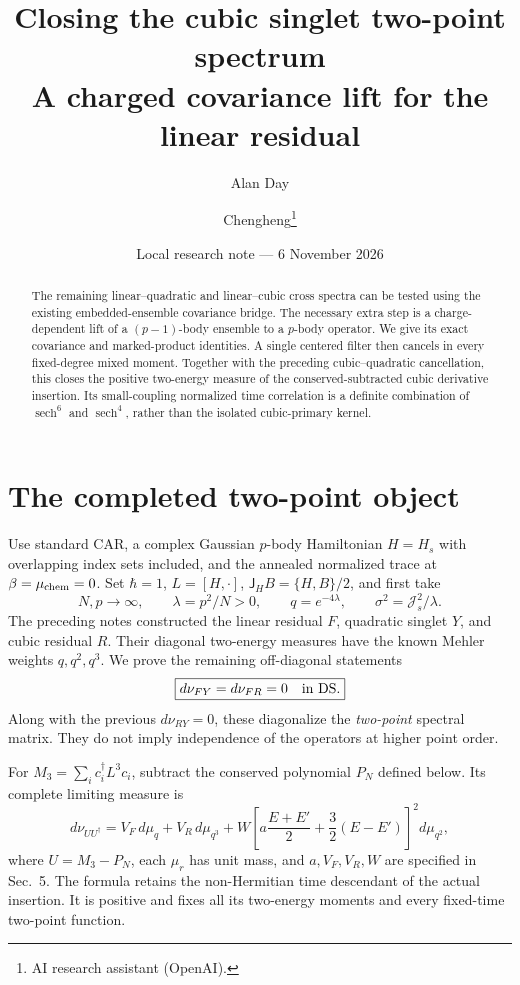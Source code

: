\documentclass[11pt,a4paper]{article}
\title{Closing the cubic singlet two-point spectrum\\A charged covariance lift for the linear residual}
\author{Alan Day \and Chengheng\thanks{AI research assistant (OpenAI).}}
\date{Local research note --- 6 November 2026}
\newcommand{\Js}{\mathcal J_s}
\newcommand{\JH}{\mathsf J_H}
\DeclareMathOperator{\sech}{sech}
\begin{document}
\maketitle
\begin{abstract}
The remaining linear--quadratic and linear--cubic cross spectra can be
tested using the existing embedded-ensemble covariance bridge. The
necessary extra step is a charge-dependent lift of a $(p-1)$-body
ensemble to a $p$-body operator. We give its exact covariance and
marked-product identities. A single centered filter then cancels in
every fixed-degree mixed moment. Together with the preceding
cubic--quadratic cancellation, this closes the positive two-energy
measure of the conserved-subtracted cubic derivative insertion. Its
small-coupling normalized time correlation is a definite combination
of $\sech^6$ and $\sech^4$, rather than the isolated cubic-primary kernel.
\end{abstract}
\section{The completed two-point object}
Use standard CAR, a complex Gaussian $p$-body Hamiltonian $H=H_s$
with overlapping index sets included, and the annealed normalized
trace at $\beta=\mu_{\rm chem}=0$. Set $\hbar=1$, $L=[H,\cdot]$,
$\JH B=\{H,B\}/2$, and first take
\[
 N,p\to\infty,\qquad\lambda=p^2/N>0,\qquad
 q=e^{-4\lambda},\qquad \sigma^2=\Js^2/\lambda.
\]
The preceding notes \cite{local} constructed the linear residual $F$,
quadratic singlet $Y$, and cubic residual $R$. Their diagonal
two-energy measures have the known Mehler weights $q,q^2,q^3$.
We prove the remaining off-diagonal statements
\begin{equation}
 \boxed{d\nu_{FY}=d\nu_{FR}=0\quad\hbox{in DS}.}\label{cross}
\end{equation}
Along with the previous $d\nu_{RY}=0$, these diagonalize the
\emph{two-point} spectral matrix. They do not imply independence
of the operators at higher point order.

For $M_3=\sum_i c_i^\dagger L^3c_i$, subtract the conserved
polynomial $P_N$ defined below. Its complete limiting measure is
\begin{equation}
 \boxed{d\nu_{UU^\dagger}=
 V_F\,d\mu_q+V_R\,d\mu_{q^3}
 +W\left[a\frac{E+E'}2+\frac32(E-E')\right]^2d\mu_{q^2},}
 \label{measure}
\end{equation}
where $U=M_3-P_N$, each $\mu_r$ has unit mass, and $a,V_F,V_R,W$
are specified in Sec.~5. The formula retains the non-Hermitian
time descendant of the actual insertion. It is positive and fixes
all its two-energy moments and every fixed-time two-point function.
\end{document}
